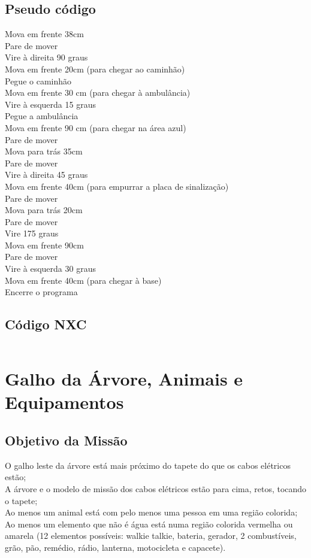 \documentclass{article}
\begin{document}
	\subsection{Pseudo código}
		Mova em frente 38cm\\
		Pare de mover\\
	    Vire à direita 90 graus\\
	    Mova em frente 20cm (para chegar ao caminhão)\\
	    Pegue o caminhão\\
	    Mova em frente 30 cm (para chegar à ambulância)\\
		Vire à esquerda 15 graus\\
		Pegue a ambulância\\
		Mova em frente 90 cm (para chegar na área azul)\\
	    Pare de mover\\
		Mova para trás 35cm\\
	    Pare de mover\\
	    Vire à direita 45 graus\\
	    Mova em frente 40cm (para empurrar a placa de sinalização)\\
	    Pare de mover\\
	    Mova para trás 20cm\\
	    Pare de mover\\
	    Vire 175 graus\\
		Mova em frente 90cm\\
		Pare de mover\\
		Vire à esquerda 30 graus\\
		Mova em frente 40cm (para chegar à base)\\
	    Encerre o programa\\

	\subsection{Código NXC}
		\inputminted[linenos, frame = single]{c}{codes/ambulancia.nxc}

\newpage
\section{Galho da Árvore, Animais e Equipamentos}

	\subsection{Objetivo da Missão}
		O galho leste da árvore está mais próximo do tapete do que os cabos elétricos estão;\\
		A árvore e o modelo de missão dos cabos elétricos estão para cima, retos, tocando o tapete;\\
		Ao menos um animal está com pelo menos uma pessoa em uma região colorida;\\
		Ao menos um elemento que não é água está numa região colorida vermelha ou amarela (12 elementos possíveis: walkie talkie, bateria, gerador, 2 combustíveis, grão, pão, remédio, rádio, lanterna, motocicleta e capacete).\\
\end{document}
